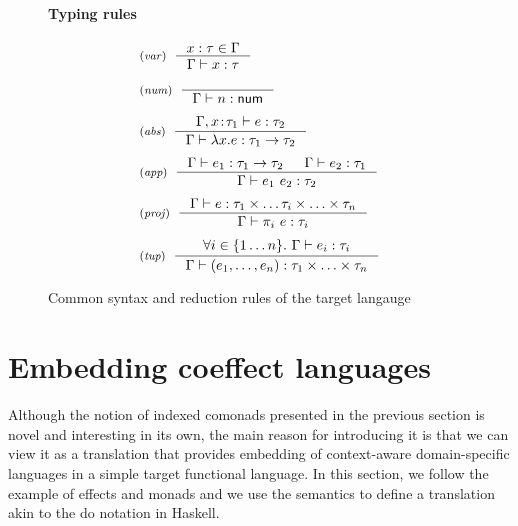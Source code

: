 \begin{figure}[t]
\paragraph{Typing rules}
\begin{equation*}
\begin{array}{l}
\tyrule{var}
  { x:\tau \in \Gamma }
  { \Gamma \vdash x:\tau }
\\[1.25em]
\tyrule{num}
  { ~ }
  { \Gamma \vdash n:\ident{num} }
\\[1.25em]
\tyrule{abs}
  { \Gamma, x\!:\!\tau_1 \vdash e : \tau_2 }
  { \Gamma \vdash \lambda x.e : \tau_1 \rightarrow \tau_2 }
\\[1.25em]
\tyrule{app}
  { \Gamma \vdash e_1 : \tau_1 \rightarrow \tau_2  & \Gamma \vdash e_2 : \tau_1 }
  { \Gamma \vdash e_1~e_2 : \tau_2 }
\\[1.25em]
\tyrule{proj}
  { \Gamma \vdash e : \tau_1 \times \ldots \tau_i \times \ldots \times \tau_n }
  { \Gamma \vdash \pi_i~e:\tau_i }
\\[1.25em]
\tyrule{tup}
  { \forall i\in\{1 \ldots n\}.~ \Gamma \vdash e_i : \tau_i }
  { \Gamma \vdash (e_1, \ldots, e_n) : \tau_1 \times \ldots \times \tau_n }
\end{array}
\end{equation*}

\caption{Common syntax and reduction rules of the target langauge}
\label{fig:semantics-target}
\end{figure}


\section{Embedding coeffect languages}
\label{sec:semantics-translation}

Although the notion of indexed comonads presented in the previous section is novel and interesting 
in its own, the main reason for introducing it is that we can view it as a translation that provides 
embedding of context-aware domain-specific languages in a simple target functional language.
In this section, we follow the example of effects and monads and we use the semantics to define a 
translation akin to the do notation in Haskell.


